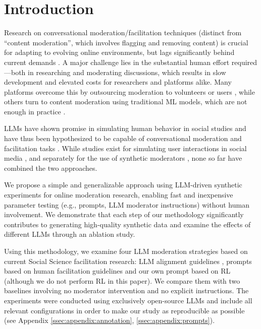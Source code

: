 %
\section{Introduction}
\label{sec:introduction}

Research on conversational moderation/facilitation techniques (distinct from “content moderation”, which involves flagging and removing content) is crucial for adapting to evolving online environments, but lags significantly behind current demands \cite{seering_self_moderation, make_reddit_great}. A major challenge lies in the substantial human effort required—both in researching and moderating discussions, which results in slow development and elevated costs for researchers and platforms alike. Many platforms overcome this by outsourcing moderation to volunteers or users \cite{Matias2019TheCL, schaffner_community_guidelines}, while others turn to content moderation using traditional \ac{ML} models, which are not enough in practice \cite{horta_automated_moderation, schaffner_community_guidelines}. 

\acfp{LLM} have shown promise in simulating human behavior in social studies \cite{park2024generativeagentsimulations1000, hewitt2024predicting, Park2023GenerativeAI} and have thus been hypothesized to be capable of conversational moderation and facilitation tasks \cite{small-polis-llm, korre2025evaluation}. While studies exist for simulating user interactions in social media \cite{park_simulacra, mou_2024, tornberg_2023, y_social, balog_2024}, and separately for the use of synthetic moderators \cite{kim_et_al_chatbot, cho-etal-2024-language}, none so far have combined the two approaches. 

We propose a simple and generalizable approach using \ac{LLM}-driven synthetic experiments for online moderation research, enabling fast and inexpensive parameter testing (e.g., prompts, \ac{LLM} moderator instructions) without human involvement. We demonstrate that each step of our methodology significantly contributes to generating high-quality synthetic data and examine the effects of different \acp{LLM} through an ablation study.

Using this methodology, we examine four \ac{LLM} moderation strategies based on current Social Science facilitation research:  \ac{LLM} alignment guidelines \cite{collective_constitution}, prompts based on human facilitation guidelines \cite{Cornell_eRulemaking2017, dimitra-book} and our own prompt based on \ac{RL} (although we do not perform \ac{RL} in this paper). We compare them with two baselines involving no moderator intervention and no explicit instructions. The experiments were conducted using exclusively open-source \acp{LLM} and include all relevant configurations in order to make our study as reproducible as possible (see Appendix \ref{ssec:appendix:annotation}, \ref{ssec:appendix:prompts}).

